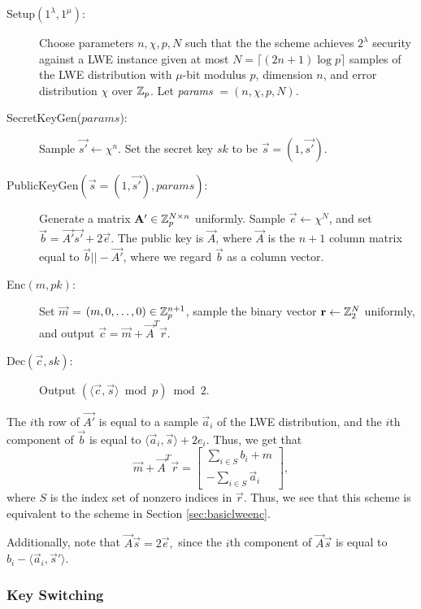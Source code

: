     \begin{description}
        \item[Setup$(1^\lambda, 1^\mu)$:] Choose parameters $n, \chi, p, N$ such that the the scheme achieves $2^\lambda$ security against a LWE instance given at most $N = \lceil (2n + 1) \log p \rceil$ samples of the LWE distribution with $\mu$-bit modulus $p$, dimension $n$, and error distribution $\chi$ over $\mathbb{Z}_p$. Let \textit{params} $=(n, \chi, p, N)$.

        \item[SecretKeyGen($params$):] Sample $\vec{s'} \leftarrow \chi^n$. Set the secret key $sk$ to be $\vec{s} = (1, \vec{s'})$.

        \item[PublicKeyGen$(\vec{s} = (1, \vec{s'}), params)$:] Generate a matrix $\mathbf{A'} \in \mathbb{Z}_p^{N \times n}$ uniformly. Sample $\vec{e} \leftarrow \chi^N$, and set $\vec{b} = \vec{A'} \vec{s'} + 2 \vec{e}$. The public key is $\vec{A}$, where $\vec{A}$ is the $n + 1$ column matrix equal to $\vec{b} || -\vec{A'}$, where we regard $\vec{b}$ as a column vector.

        \item[Enc$(m, pk)$:] Set $\vec{m}$ = $(m, 0, \dots, 0) \in \mathbb{Z}_p^{n+1}$, sample the binary vector $\mathbf{r} \leftarrow \mathbb{Z}_2^{N}$ uniformly, and output $\vec{c} = \vec{m} + \vec{A}^T \vec{r}$.

        \item[Dec$(\vec{c}, sk)$:] Output $(\langle \vec{c}, \vec{s} \rangle \bmod p) \bmod 2$.
    \end{description}

    The $i$th row of $\vec{A'}$ is equal to a sample $\vec{a}_i$ of the LWE distribution, and the $i$th component of $\vec{b}$ is equal to $\langle \vec{a}_i, \vec{s} \rangle + 2 e_i$. Thus, we get that
    \[\vec{m} + \vec{A}^T \vec{r} = \begin{bmatrix} \sum_{i \in S} b_i + m \\ -\sum_{i \in S} \vec{a}_i \end{bmatrix},\]
    where $S$ is the index set of nonzero indices in $\vec{r}$. Thus, we see that this scheme is equivalent to the scheme in Section \ref{sec:basiclweenc}.

    Additionally, note that $\vec{A} \vec{s} = 2 \vec{e},$ since the $i$th component of $\vec{A} \vec{s}$ is equal to $b_i - \langle \vec{a}_i, \vec{s}'\rangle$.

    \subsubsection{Key Switching}

